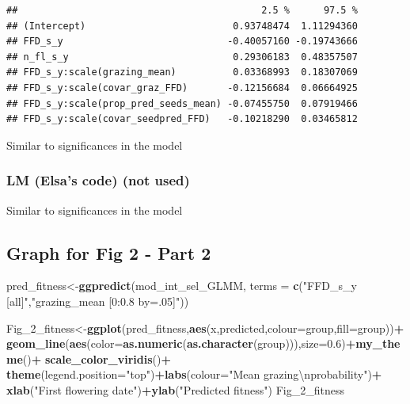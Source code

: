 \documentclass[
]{article}
\newenvironment{Shaded}{\begin{snugshade}}{\end{snugshade}}
\newcommand{\CharTok}[1]{\textcolor[rgb]{0.31,0.60,0.02}{#1}}
\newcommand{\DataTypeTok}[1]{\textcolor[rgb]{0.13,0.29,0.53}{#1}}
\newcommand{\DecValTok}[1]{\textcolor[rgb]{0.00,0.00,0.81}{#1}}
\newcommand{\FloatTok}[1]{\textcolor[rgb]{0.00,0.00,0.81}{#1}}
\newcommand{\KeywordTok}[1]{\textcolor[rgb]{0.13,0.29,0.53}{\textbf{#1}}}
\newcommand{\NormalTok}[1]{#1}
\newcommand{\OperatorTok}[1]{\textcolor[rgb]{0.81,0.36,0.00}{\textbf{#1}}}
\newcommand{\StringTok}[1]{\textcolor[rgb]{0.31,0.60,0.02}{#1}}
\begin{document}
\begin{verbatim}
##                                           2.5 %      97.5 %
## (Intercept)                          0.93748474  1.11294360
## FFD_s_y                             -0.40057160 -0.19743666
## n_fl_s_y                             0.29306183  0.48357507
## FFD_s_y:scale(grazing_mean)          0.03368993  0.18307069
## FFD_s_y:scale(covar_graz_FFD)       -0.12156684  0.06664925
## FFD_s_y:scale(prop_pred_seeds_mean) -0.07455750  0.07919466
## FFD_s_y:scale(covar_seedpred_FFD)   -0.10218290  0.03465812
\end{verbatim}

Similar to significances in the model

\hypertarget{lm-elsas-code-not-used-1}{%
\subsubsection{LM (Elsa's code) (not
used)}\label{lm-elsas-code-not-used-1}}

Similar to significances in the model

\hypertarget{graph-for-fig-2---part-2}{%
\subsection{Graph for Fig 2 - Part 2}\label{graph-for-fig-2---part-2}}

\begin{Shaded}
\begin{Highlighting}[]
\NormalTok{pred\_fitness\textless{}{-}}\KeywordTok{ggpredict}\NormalTok{(mod\_int\_sel\_GLMM,}
                        \DataTypeTok{terms =} \KeywordTok{c}\NormalTok{(}\StringTok{"FFD\_s\_y [all]"}\NormalTok{,}\StringTok{"grazing\_mean [0:0.8 by=.05]"}\NormalTok{))}
\end{Highlighting}
\end{Shaded}

\begin{Shaded}
\begin{Highlighting}[]
\NormalTok{Fig\_}\DecValTok{2}\NormalTok{\_fitness\textless{}{-}}\KeywordTok{ggplot}\NormalTok{(pred\_fitness,}\KeywordTok{aes}\NormalTok{(x,predicted,}\DataTypeTok{colour=}\NormalTok{group,}\DataTypeTok{fill=}\NormalTok{group))}\OperatorTok{+}
\StringTok{  }\KeywordTok{geom\_line}\NormalTok{(}\KeywordTok{aes}\NormalTok{(}\DataTypeTok{color=}\KeywordTok{as.numeric}\NormalTok{(}\KeywordTok{as.character}\NormalTok{(group))),}\DataTypeTok{size=}\FloatTok{0.6}\NormalTok{)}\OperatorTok{+}\KeywordTok{my\_theme}\NormalTok{()}\OperatorTok{+}
\StringTok{  }\KeywordTok{scale\_color\_viridis}\NormalTok{()}\OperatorTok{+}
\StringTok{  }\KeywordTok{theme}\NormalTok{(}\DataTypeTok{legend.position=}\StringTok{"top"}\NormalTok{)}\OperatorTok{+}\KeywordTok{labs}\NormalTok{(}\DataTypeTok{colour=}\StringTok{"Mean grazing}\CharTok{\textbackslash{}n}\StringTok{probability"}\NormalTok{)}\OperatorTok{+}
\StringTok{  }\KeywordTok{xlab}\NormalTok{(}\StringTok{"First flowering date"}\NormalTok{)}\OperatorTok{+}\KeywordTok{ylab}\NormalTok{(}\StringTok{"Predicted fitness"}\NormalTok{)}
\NormalTok{Fig\_}\DecValTok{2}\NormalTok{\_fitness}
\end{Highlighting}
\end{Shaded}
\end{document}
